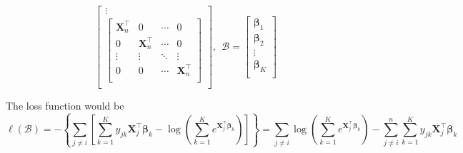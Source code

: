 \documentclass[11pt]{article}
\newcommand{\bX}{\bm{X}}
\newcommand{\bbeta}{\bm{\beta}}
\begin{document}
\[\begin{bmatrix}
\vdots \\
\begin{bmatrix}
\bX_n^\top & 0 & \cdots & 0 \\
0 & \bX_n^\top & \cdots & 0 \\
\vdots & \vdots & \ddots & \vdots \\
0 & 0 & \cdots & \bX_n^\top \\
\end{bmatrix} \\
\end{bmatrix},\ \ 
\bm{\mathcal{B}}=\begin{bmatrix}
\bbeta_{1} \\
\bbeta_{2} \\
\vdots \\
\bbeta_{K} \\
\end{bmatrix}\]

The loss function would be 
\[\ell(\bm{\mathcal{B}})=-\left\{\sum_{j\neq i}\left[\sum_{k=1}^K
y_{jk}\bX_j^\top\bbeta_k-
\log\left(\sum_{k=1}^Ke^{\bX_j^\top\bbeta_k}\right)
\right]\right\}=\sum_{j\neq i}\log\left(\sum_{k=1}^Ke^{\bX_j^\top\bbeta_k}\right)-
\sum_{j\neq i}^n\sum_{k=1}^Ky_{jk}\bX_j^\top\bbeta_k\]
\end{document}
